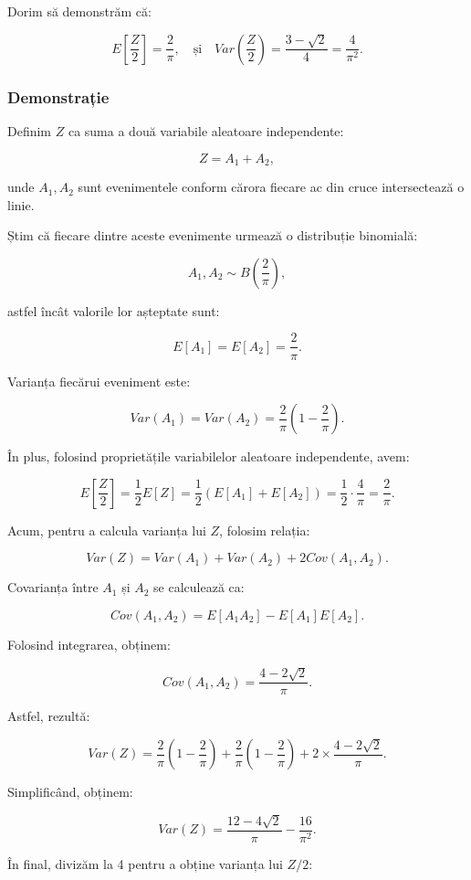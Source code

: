 \documentclass{article}
\begin{document}
Dorim să demonstrăm că:

\[
E\left[\frac{Z}{2}\right] = \frac{2}{\pi}, \quad \text{și} \quad Var\left(\frac{Z}{2}\right) = \frac{3 - \sqrt{2}}{4} = \frac{4}{\pi^2}.
\]

\subsubsection*{Demonstrație}

Definim \( Z \) ca suma a două variabile aleatoare independente:

\[
Z = A_1 + A_2,
\]

unde \( A_1, A_2 \) sunt evenimentele conform cărora fiecare ac din cruce intersectează o linie.

Știm că fiecare dintre aceste evenimente urmează o distribuție binomială:

\[
A_1, A_2 \sim B\left(\frac{2}{\pi}\right),
\]

astfel încât valorile lor așteptate sunt:

\[
E[A_1] = E[A_2] = \frac{2}{\pi}.
\]

Varianța fiecărui eveniment este:

\[
Var(A_1) = Var(A_2) = \frac{2}{\pi} \left( 1 - \frac{2}{\pi} \right).
\]

În plus, folosind proprietățile variabilelor aleatoare independente, avem:

\[
E\left[\frac{Z}{2}\right] = \frac{1}{2} E[Z] = \frac{1}{2} (E[A_1] + E[A_2]) = \frac{1}{2} \cdot \frac{4}{\pi} = \frac{2}{\pi}.
\]

Acum, pentru a calcula varianța lui \( Z \), folosim relația:

\[
Var(Z) = Var(A_1) + Var(A_2) + 2Cov(A_1, A_2).
\]

Covarianța între \( A_1 \) și \( A_2 \) se calculează ca:

\[
Cov(A_1, A_2) = E[A_1A_2] - E[A_1]E[A_2].
\]

Folosind integrarea, obținem:

\[
Cov(A_1, A_2) = \frac{4 - 2\sqrt{2}}{\pi}.
\]

Astfel, rezultă:

\[
Var(Z) = \frac{2}{\pi} \left( 1 - \frac{2}{\pi} \right) + \frac{2}{\pi} \left( 1 - \frac{2}{\pi} \right) + 2 \times \frac{4 - 2\sqrt{2}}{\pi}.
\]

Simplificând, obținem:

\[
Var(Z) = \frac{12 - 4\sqrt{2}}{\pi} - \frac{16}{\pi^2}.
\]

În final, divizăm la 4 pentru a obține varianța lui \( Z/2 \):
\end{document}
